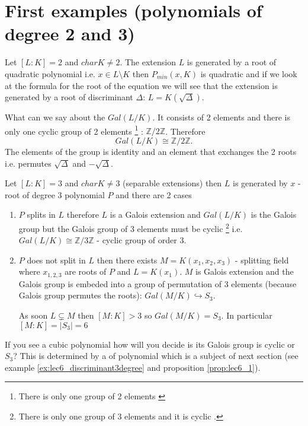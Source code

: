 \section{First examples (polynomials of degree 2 and 3)}

\begin{example}[Degree 2]
  Let $\left[L:K\right] = 2$ and $char K \ne 2$. The extension $L$ is
  generated by a root of 
  quadratic polynomial i.e. $x \in L \setminus K$ then
  $P_{min}\left(x, K\right)$ is quadratic and if we look at the
  formula for the root of the equation we will see that the extension
  is generated by a root of discriminant $\Delta$:
  $L = K\left(\sqrt{\Delta}\right)$.

  What can we say about the $Gal\left(L/K\right)$. It consists of 2
  elements and there is only one cyclic group of 2 elements
  \footnote{
    There is only one group of 2 elements \cite{wiki:finitegroup}
  }
  :
  $\mathbb{Z}/2\mathbb{Z}$. Therefore
  \[
  Gal\left(L/K\right) \cong \mathbb{Z}/2\mathbb{Z}.
  \]
  The elements of the group is identity and an element that exchanges
  the 2 roots i.e. permutes $\sqrt{\Delta}$ and $-\sqrt{\Delta}$.
\end{example}

\begin{example}[Degree 3]
    Let $\left[L:K\right] = 3$ and $char K \ne 3$ (separable
    extensions) then $L$ is generated by $x$ - root of 
    degree 3 polynomial $P$ and there are 2 cases
    \begin{enumerate}
    \item $P$ splits in $L$ therefore $L$ is a Galois extension and
      $Gal\left(L/K\right)$ is the Galois group but the
      Galois group of 3 elements must be cyclic
      \footnote{
        There is only one group of 3 elements 
        and it is cyclic \cite{wiki:finitegroup}.
      }
      i.e.
      $Gal\left(L/K\right) \cong \mathbb{Z}/3\mathbb{Z}$ - cyclic
      group of order 3.
    \item $P$ does not split in $L$ then there exists
      $M = K\left(x_1, x_2, x_3\right)$ - splitting field where
      $x_{1,2,3}$ are roots of $P$ and $L = K\left(x_1\right)$. $M$ is
      Galois extension and the Galois group is embeded into a group of
      permutation of 3 elements (because Galois group permutes the roots):
      $Gal\left(M/K\right) \hookrightarrow S_3$.

      As soon $L \subsetneq M$ then $\left[M:K\right] > 3$ so
      $Gal\left(M/K\right) = S_3$. In particular
      $\left[M:K\right] = \left|S_3\right| = 6$
    \end{enumerate}

    If you see a cubic polynomial how will you decide is its Galois
    group is cyclic or $S_3$? This is determined by a
     of polynomial which is a subject of
    next section (see example \ref{ex:lec6_discriminant3degree}
    and proposition \ref{prop:lec6_1}).

    \label{ex:lec6_degree3}
\end{example}

